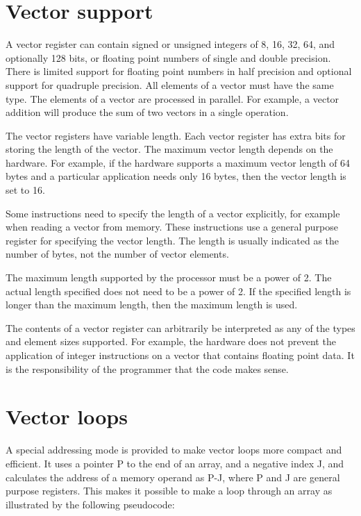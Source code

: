 \documentclass[forwardcom.tex]{subfiles}
\begin{document}
\section{Vector support}
A vector register can contain signed or unsigned integers of 8, 16, 32, 64, and optionally 128 bits, or floating point numbers of single and double precision. There is limited support for floating point numbers in half precision and optional support for quadruple precision. All elements of a vector must have the same type. The elements of a vector are processed in parallel. For example, a vector addition will produce the sum of two vectors in a single operation.
\vspace{2mm}

The vector registers have variable length. Each vector register has extra bits for storing the length of the vector. The maximum vector length depends on the hardware. 
For example, if the hardware supports a maximum vector length of 64 bytes and a particular application needs only 16 bytes, then the vector length is set to 16.
\vspace{2mm}

Some instructions need to specify the length of a vector explicitly, for example when reading a vector from memory. These instructions use a general purpose register for specifying the vector length. The length is usually indicated as the number of bytes, not the number of vector elements.
\vspace{2mm}

The maximum length supported by the processor must be a power of 2. The actual length specified does not need to be a power of 2. If the specified length is longer than the maximum length, then the maximum length is used.
\vspace{2mm}

The contents of a vector register can arbitrarily be interpreted as any of the types and element sizes supported. For example, the hardware does not prevent the application of integer instructions on a vector that contains floating point data. It is the responsibility of the programmer that the code makes sense.

\section{Vector loops} \label{vectorLoops}
A special addressing mode is provided to make vector loops more compact and efficient. It uses a pointer P to the end of an array, and a negative index J, and calculates the address of a memory operand as P-J, where P and J are general purpose registers. This makes it possible to make a loop through an array as illustrated by the following pseudocode:
\vspace{2mm}
\end{document}
